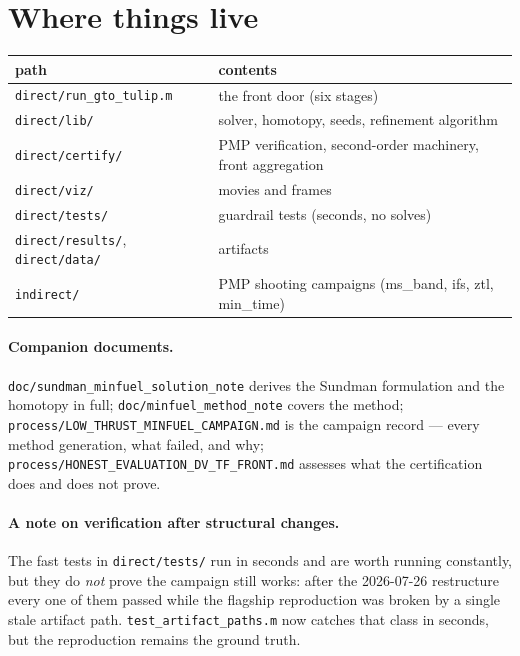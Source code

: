 \documentclass[11pt]{article}
\newcommand{\file}[1]{\texttt{#1}}
\begin{document}
\section{Where things live}

\begin{center}
\begin{tabular}{ll}
\toprule
path & contents \\
\midrule
\file{direct/run\_gto\_tulip.m} & the front door (six stages) \\
\file{direct/lib/}      & solver, homotopy, seeds, refinement algorithm \\
\file{direct/certify/}  & PMP verification, second-order machinery, front aggregation \\
\file{direct/viz/}      & movies and frames \\
\file{direct/tests/}    & guardrail tests (seconds, no solves) \\
\file{direct/results/}, \file{direct/data/} & artifacts \\
\file{indirect/}        & PMP shooting campaigns (ms\_band, ifs, ztl, min\_time) \\
\bottomrule
\end{tabular}
\end{center}

\paragraph{Companion documents.}
\file{doc/sundman\_minfuel\_solution\_note} derives the Sundman formulation and
the homotopy in full; \file{doc/minfuel\_method\_note} covers the method;
\file{process/LOW\_THRUST\_MINFUEL\_CAMPAIGN.md} is the campaign record ---
every method generation, what failed, and why;
\file{process/HONEST\_EVALUATION\_DV\_TF\_FRONT.md} assesses what the
certification does and does not prove.

\paragraph{A note on verification after structural changes.} The fast tests in
\file{direct/tests/} run in seconds and are worth running constantly, but they
do \emph{not} prove the campaign still works: after the 2026-07-26
restructure every one of them passed while the flagship reproduction was
broken by a single stale artifact path. \file{test\_artifact\_paths.m} now
catches that class in seconds, but the reproduction remains the ground truth.
\end{document}

